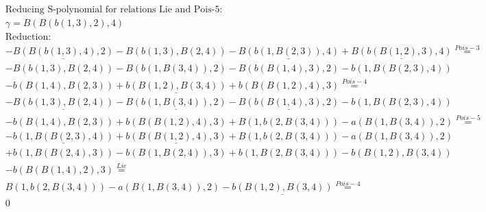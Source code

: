 \documentclass[11pt]{amsart}
\begin{document}
\begin{align*} 
& \text{Reducing S-polynomial for relations Lie and Pois-5:} \\ 
& \gamma = B(B(b(1,3),2),4) \\ 
& \text{Reduction}: \\& - \underline{B(B(b(1,3),4),2)} - B(b(1,3),B(2,4)) - \underline{B(b(1,B(2,3)),4)} + \underline{B(b(B(1,2),3),4)} \stackrel{ Pois-3 }{=}  \\ 
& - B(b(1,3),B(2,4)) - B(b(1,B(3,4)),2) - B(b(B(1,4),3),2) - b(1,B(B(2,3),4))\\ 
 &  - b(B(1,4),B(2,3)) + \underline{b(B(1,2),B(3,4))} + b(B(B(1,2),4),3) \stackrel{ Pois-4 }{=}  \\ 
& - \underline{B(b(1,3),B(2,4))} - \underline{B(b(1,B(3,4)),2)} - \underline{B(b(B(1,4),3),2)} - b(1,B(B(2,3),4))\\ 
 &  - b(B(1,4),B(2,3)) + b(B(B(1,2),4),3) + B(1,b(2,B(3,4))) - a(B(1,B(3,4)),2) \stackrel{ Pois-5 }{=}  \\ 
& - \underline{b(1,B(B(2,3),4))} + \underline{b(B(B(1,2),4),3)} + B(1,b(2,B(3,4))) - a(B(1,B(3,4)),2)\\ 
 &  + b(1,B(B(2,4),3)) - b(B(1,B(2,4)),3) + b(1,B(2,B(3,4))) - b(B(1,2),B(3,4))\\ 
 &  - b(B(B(1,4),2),3) \stackrel{ Lie }{=}  \\ 
&B(1,b(2,B(3,4))) - a(B(1,B(3,4)),2) - \underline{b(B(1,2),B(3,4))} \stackrel{ Pois-4 }{=}  \\ 
&0\\ 
\end{align*} 
 
\end{document}
